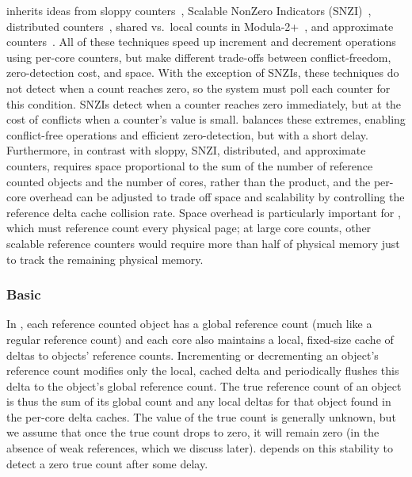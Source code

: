  inherits ideas from sloppy
counters~\cite{boyd-wickizer:scaling}, Scalable NonZero Indicators
(SNZI)~\cite{snzi:podc}, distributed counters~\cite{appavoo:k42},
shared vs.\ local counts in Modula-2+~\cite{detreville:concurrent-gc},
and approximate counters~\cite{approx:counter}.
%
%
All of these techniques speed up increment and decrement operations
using per-core counters, but make different trade-offs between
conflict-freedom, zero-detection cost, and space.  With the exception
of SNZIs, these techniques do not detect when a count reaches zero, so
the system must poll each counter for this condition.  SNZIs detect
when a counter reaches zero immediately, but at the cost of conflicts
when a counter's value is small.   balances these extremes, enabling
conflict-free operations and efficient zero-detection, but with a
short delay.
%
Furthermore, in contrast with sloppy, SNZI, distributed, and
approximate counters, 
requires space proportional to the sum of the number of reference
counted objects and the number of cores, rather than the product, and
the per-core overhead can be adjusted to trade off space and
scalability by controlling the reference delta cache collision rate.
%
Space overhead is particularly important for \vm, which must reference
count every physical page; at large core counts, other scalable
reference counters
would require more than half of physical memory just to track the
remaining physical memory.

\subsubsection{Basic }
In , each reference counted object has a global reference
count (much like a regular reference count) and each core also
maintains a local, fixed-size cache of deltas to objects' reference
counts.  Incrementing or decrementing an object's reference count
modifies only the local, cached delta and  periodically
flushes this delta to the object's global reference count.
%
The true reference
count of an object is thus the sum of its global count and any local
deltas for that object found in the per-core delta caches.  The value of the
true count is generally unknown, but we assume that once the true
count drops to
zero, it will remain zero (in the absence of weak references, which
we discuss later).   depends on this stability to detect a
zero true count after some delay.

